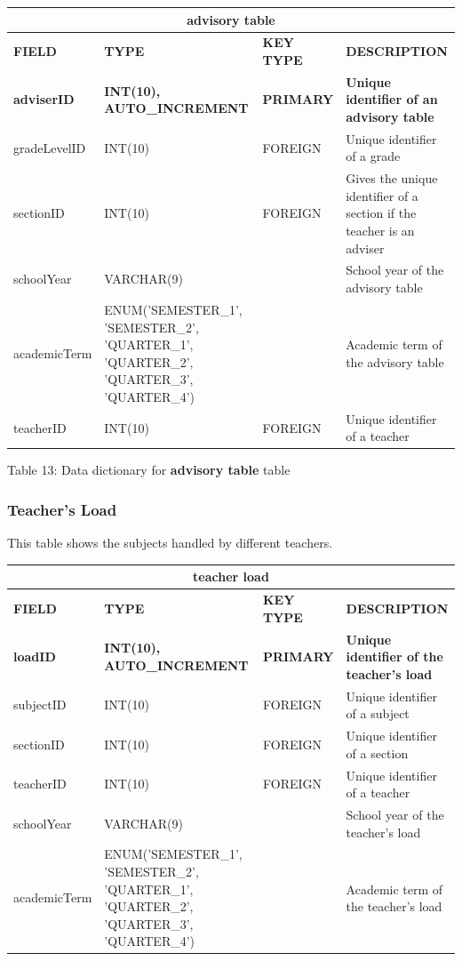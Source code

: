 \documentclass[11pt,a4paper,titlepage]{article}
\begin{document}
\vspace{.5cm}
\begin{longtable}{ |p{2.5cm}|p{4.5cm}|p{2.5cm}|p{3cm}|  }
    \hline
    \multicolumn{4}{|c|}{\textbf{advisory table}} \\
    \hline
    \textbf{FIELD}&\textbf{TYPE}&\textbf{KEY TYPE}&\textbf{DESCRIPTION}\\
    \hline
    \textbf{adviserID}  & \textbf{INT(10), AUTO\_INCREMENT} & \textbf{PRIMARY} & \textbf{Unique identifier of an advisory table}\\ \hline
    gradeLevelID   & INT(10) & FOREIGN & Unique identifier of a grade   \\ \hline
    sectionID   & INT(10)   & FOREIGN & Gives the unique identifier of a section if the teacher is an adviser\\ \hline
    schoolYear   & VARCHAR(9)   & & School year of the advisory table\\ \hline
    academicTerm   & ENUM('SEMESTER\_1', 'SEMESTER\_2', 'QUARTER\_1', 'QUARTER\_2', 'QUARTER\_3', 'QUARTER\_4')   & & Academic term of the advisory table\\ \hline
    teacherID & INT(10) & FOREIGN & Unique identifier of a teacher\\ \hline
\end{longtable}

\vspace{.5cm}
\begin{center}
    Table 13: Data dictionary for \textbf{advisory table} table
\end{center}

\newpage

\subsubsection{Teacher's Load}

This table shows the subjects handled by different teachers.

\vspace{1cm}
\begin{longtable}{ |p{2.5cm}|p{4.5cm}|p{2.5cm}|p{3cm}|  }
    \hline
    \multicolumn{4}{|c|}{\textbf{teacher load}} \\
    \hline
    \textbf{FIELD}&\textbf{TYPE}&\textbf{KEY TYPE}&\textbf{DESCRIPTION}\\
    \hline
    \textbf{loadID}  & \textbf{INT(10), AUTO\_INCREMENT} & \textbf{PRIMARY} & \textbf{Unique identifier of the teacher's load}\\ \hline
    subjectID   & INT(10) & FOREIGN & Unique identifier of a subject\\ \hline
    sectionID   & INT(10) & FOREIGN & Unique identifier of a section\\ \hline
    teacherID   & INT(10) & FOREIGN & Unique identifier of a teacher\\ \hline
    schoolYear   & VARCHAR(9)   & & School year of the teacher's load\\ \hline
    academicTerm   & ENUM('SEMESTER\_1', 'SEMESTER\_2', 'QUARTER\_1', 'QUARTER\_2', 'QUARTER\_3', 'QUARTER\_4')   & & Academic term of the teacher's load\\ \hline
\end{longtable}
\end{document}
